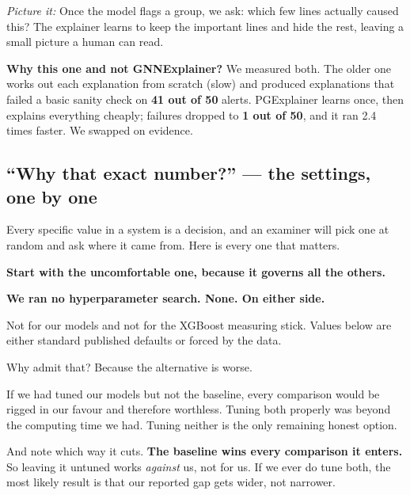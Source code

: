 \documentclass[11pt,a4paper]{article}
\newcommand{\pw}[1]{\textit{\textcolor{accent}{Picture it:}} #1}
\begin{document}
\pw{Once the model flags a group, we ask: which few lines actually caused this?
The explainer learns to keep the important lines and hide the rest, leaving a
small picture a human can read.}

\textbf{Why this one and not GNNExplainer?} We measured both. The older one works
out each explanation from scratch (slow) and produced explanations that failed a
basic sanity check on \textbf{41 out of 50} alerts. PGExplainer learns once, then
explains everything cheaply; failures dropped to \textbf{1 out of 50}, and it ran
2.4 times faster. We swapped on evidence.

\subsection{``Why that exact number?'' --- the settings, one by one}
\label{sec:whynumbers}

Every specific value in a system is a decision, and an examiner will pick one at
random and ask where it came from. Here is every one that matters.

\begin{warnbox}
\textbf{Start with the uncomfortable one, because it governs all the others.}

\textbf{We ran no hyperparameter search. None. On either side.}

Not for our models and not for the XGBoost measuring stick. Values below are
either standard published defaults or forced by the data.

Why admit that? Because the alternative is worse.

If we had tuned our models but not the baseline, every comparison would be
rigged in our favour and therefore worthless. Tuning both properly was beyond
the computing time we had. Tuning neither is the only remaining honest option.

And note which way it cuts. \textbf{The baseline wins every comparison it
enters.} So leaving it untuned works \emph{against} us, not for us. If we ever
do tune both, the most likely result is that our reported gap gets wider, not
narrower.
\end{warnbox}
\end{document}
